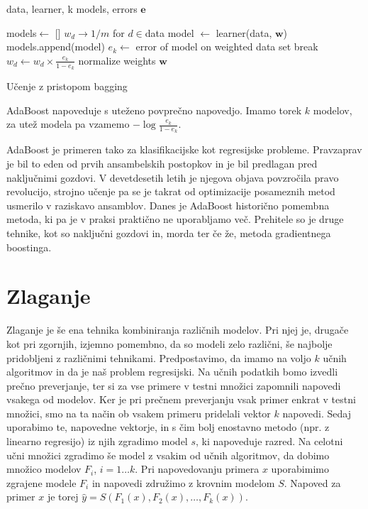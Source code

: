 \begin{algorithm}
  \begin{algorithmic}
    \REQUIRE data, learner, k
    \ENSURE models, errors $\bm e$

  \STATE models$\leftarrow$ []
  \STATE $w_d\to 1/m$ for $d\in$data
  \STATE model $\leftarrow$ learner(data, $\bm w$)
  \STATE models.append(model)
  \STATE $e_k\leftarrow$ error of model on weighted data set
  \STATE break
  \ENDIF
  \STATE $w_d\leftarrow w_d\times\frac{e_k}{1-e_k}$
  \ENDFOR
  \STATE normalize weights $\bm w$
  \ENDFOR
\end{algorithmic}
\caption{Učenje z pristopom bagging}
\label{alg:adaboost}
\end{algorithm}

AdaBoost napoveduje s uteženo povprečno napovedjo. Imamo torek $k$ modelov, za utež modela pa vzamemo $-\log\frac{e_k}{1-e_k}$.

AdaBoost je primeren tako za klasifikacijske kot regresijske probleme. Pravzaprav je bil to eden od prvih ansambelskih postopkov in je bil predlagan pred naključnimi gozdovi. V devetdesetih letih je njegova objava povzročila pravo revolucijo, strojno učenje pa se je takrat od optimizacije posameznih metod usmerilo v raziskavo ansamblov. Danes je AdaBoost historično pomembna metoda, ki pa je v praksi praktično ne uporabljamo več. Prehitele so je druge tehnike, kot so naključni gozdovi in, morda ter če že, metoda gradientnega boostinga.

\section{Zlaganje}

Zlaganje  je še ena tehnika kombiniranja različnih modelov. Pri njej je, drugače kot pri zgornjih, izjemno pomembno, da so modeli zelo različni, še najbolje pridobljeni z različnimi tehnikami. Predpostavimo, da imamo na voljo $k$ učnih algoritmov in da je naš problem regresijski. Na učnih podatkih bomo izvedli prečno preverjanje, ter si za vse primere v testni množici zapomnili napovedi vsakega od modelov. Ker je pri prečnem preverjanju vsak primer enkrat v testni množici, smo na ta način ob vsakem primeru pridelali vektor $k$ napovedi. Sedaj uporabimo te, napovedne vektorje, in s čim bolj enostavno metodo (npr. z linearno regresijo) iz njih zgradimo model $s$, ki napoveduje razred. Na celotni učni množici zgradimo še model z vsakim od učnih algoritmov, da dobimo množico modelov $F_i$, $i=1\ldots k$. Pri napovedovanju primera $x$ uporabimimo zgrajene modele $F_i$ in napovedi združimo z krovnim modelom $S$. Napoved za primer $x$ je torej $\hat{y}=S(F_1(x),F_2(x),\ldots,F_k(x))$.

